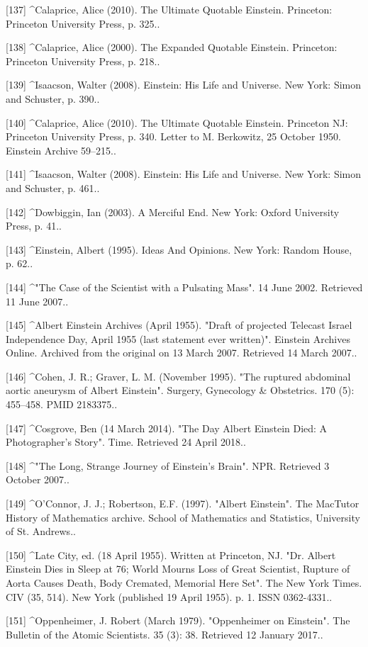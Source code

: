 [137]
^Calaprice, Alice (2010). The Ultimate Quotable Einstein. Princeton: Princeton University Press, p. 325..

[138]
^Calaprice, Alice (2000). The Expanded Quotable Einstein. Princeton: Princeton University Press, p. 218..

[139]
^Isaacson, Walter (2008). Einstein: His Life and Universe. New York: Simon and Schuster, p. 390..

[140]
^Calaprice, Alice (2010). The Ultimate Quotable Einstein. Princeton NJ: Princeton University Press, p. 340. Letter to M. Berkowitz, 25 October 1950. Einstein Archive 59–215..

[141]
^Isaacson, Walter (2008). Einstein: His Life and Universe. New York: Simon and Schuster, p. 461..

[142]
^Dowbiggin, Ian (2003). A Merciful End. New York: Oxford University Press, p. 41..

[143]
^Einstein, Albert (1995). Ideas And Opinions. New York: Random House, p. 62..

[144]
^"The Case of the Scientist with a Pulsating Mass". 14 June 2002. Retrieved 11 June 2007..

[145]
^Albert Einstein Archives (April 1955). "Draft of projected Telecast Israel Independence Day, April 1955 (last statement ever written)". Einstein Archives Online. Archived from the original on 13 March 2007. Retrieved 14 March 2007..

[146]
^Cohen, J. R.; Graver, L. M. (November 1995). "The ruptured abdominal aortic aneurysm of Albert Einstein". Surgery, Gynecology & Obstetrics. 170 (5): 455–458. PMID 2183375..

[147]
^Cosgrove, Ben (14 March 2014). "The Day Albert Einstein Died: A Photographer's Story". Time. Retrieved 24 April 2018..

[148]
^"The Long, Strange Journey of Einstein's Brain". NPR. Retrieved 3 October 2007..

[149]
^O'Connor, J. J.; Robertson, E.F. (1997). "Albert Einstein". The MacTutor History of Mathematics archive. School of Mathematics and Statistics, University of St. Andrews..

[150]
^Late City, ed. (18 April 1955). Written at Princeton, NJ. "Dr. Albert Einstein Dies in Sleep at 76; World Mourns Loss of Great Scientist, Rupture of Aorta Causes Death, Body Cremated, Memorial Here Set". The New York Times. CIV (35, 514). New York (published 19 April 1955). p. 1. ISSN 0362-4331..

[151]
^Oppenheimer, J. Robert (March 1979). "Oppenheimer on Einstein". The Bulletin of the Atomic Scientists. 35 (3): 38. Retrieved 12 January 2017..

